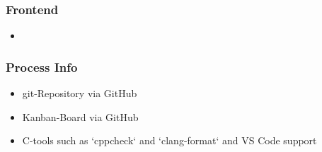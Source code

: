 \documentclass[10pt, xcolor=svgnames]{beamer}
\begin{document}
\begin{frame}
    \frametitle{Frontend}

    \begin{itemize}
        \item
    \end{itemize}
\end{frame}

\begin{frame}
    \frametitle{Process Info}

    \begin{itemize}
        \item git-Repository via GitHub
        \item Kanban-Board via GitHub
        \item C-tools such as `cppcheck` and `clang-format` and VS Code support
    \end{itemize}
\end{frame}
\end{document}
